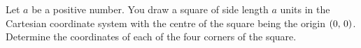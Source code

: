 \documentclass[a4paper,oneside,12pt]{article}
\begin{document}
\begin{problem}
\item\label{prob:square_centre_origin}
  Let $a$ be a positive number.  You draw a square of side length $a$
  units in the Cartesian coordinate system with the centre of the
  square being the origin $\left\lparen{0},\, {0}\right\rparen$.  Determine the coordinates
  of each of the four corners of the square.


\end{problem}
\end{document}
